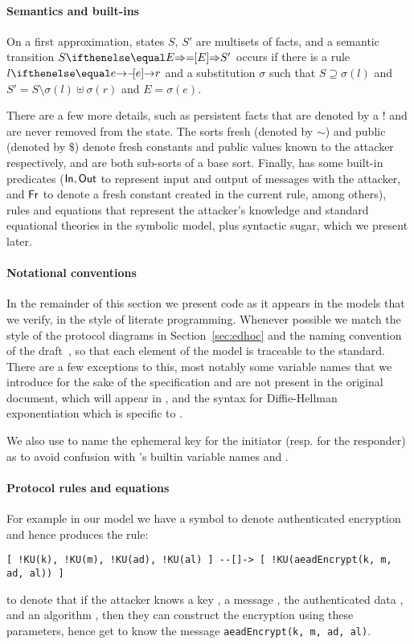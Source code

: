 \paragraph{Semantics and built-ins} On a first approximation, \mTamarin{} states
$S$, $S'$ are multisets of facts, and a semantic transition $S \semarrow[E] S'$
occurs if there is a rule $l \ifarrow[e] r$ and a substitution $\sigma$ such
that $S \supseteq \sigma(l)$ and $S' = S \setminus \sigma(l) \uplus \sigma(r)$
and $E = \sigma(e)$.

There are a few more details, such as persistent facts that are denoted by a $!$
and are never removed from the state.
%
The sorts fresh (denoted by $\sim$) and public (denoted by $\$$) denote fresh
constants and public values known to the attacker respectively, and are both
sub-sorts of a base sort.
%
Finally, \mTamarin{} has some built-in predicates ($\mathsf{In},
\mathsf{Out}$ to represent input and output of messages with the attacker,
and
$\mathsf{Fr}$ to denote a fresh constant created in the current rule, among
others), rules and equations that represent the attacker's knowledge
and standard equational theories in the symbolic model, plus syntactic
sugar, which we present later.

\paragraph{Notational conventions} In the remainder of this section we present
\mTamarin{} code as it appears in the models that we verify, in the style of
literate programming.  Whenever possible we match the style of the protocol
diagrams in Section~\ref{sec:edhoc} and the naming convention of the \mEdhoc{}
draft~\cite{selander-lake-edhoc-01}, so that each element of the model is
traceable to the standard.  There are a few exceptions to this, most notably
some variable names that we introduce for the sake of the specification and are
not present in the original document, which will appear in , and
the syntax for Diffie-Hellman exponentiation which is specific to \mTamarin{}.

We also use  to name the ephemeral key for the initiator (resp. 
for the responder) as to avoid confusion with \mTamarin's builtin variable
names  and .

\paragraph{Protocol rules and equations}
For example in our model we have a symbol to denote authenticated encryption and
hence \mTamarin{} produces the rule:
%
\begin{lstlisting}
[ !KU(k), !KU(m), !KU(ad), !KU(al) ] --[]-> [ !KU(aeadEncrypt(k, m, ad, al)) ]
\end{lstlisting}
%
to denote that if the attacker knows a key , a message , the
authenticated data , and an algorithm , then they can construct
the encryption using these parameters, hence get to know the message
\lstinline{aeadEncrypt(k, m, ad, al)}.


